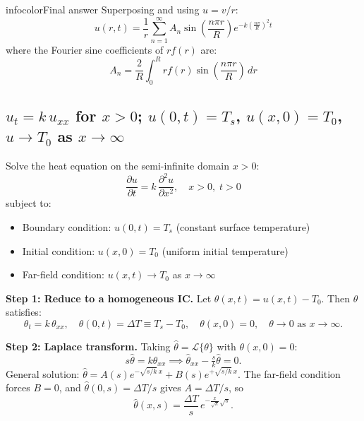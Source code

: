 \documentclass[a4paper,11pt]{article} %
\newenvironment{summarybox}[1][]{\begin{custombox}[#1]{infocolor}{Final answer}}{\end{custombox}}
\begin{document}
\begin{summarybox}[title={General Solution}]
Superposing and using $u=v/r$:
$$ u(r,t) = \frac{1}{r} \sum_{n=1}^{\infty} A_n \sin\!\left(\frac{n\pi r}{R}\right) e^{-k \left(\frac{n\pi}{R}\right)^2 t} $$
where the Fourier sine coefficients of $rf(r)$ are:
$$ A_n = \frac{2}{R} \int_0^R r f(r) \sin\left(\frac{n\pi r}{R}\right) \, dr $$
\end{summarybox}

\newpage
\subsection{\texorpdfstring{$u_t = k\,u_{xx}$ for $x>0$; $u(0,t)=T_s$, $u(x,0)=T_0$, $u\to T_0$ as $x\to\infty$}{Semi-infinite heat equation: Laplace transform in time reduces to ODE; inverse gives error-function solution}}

\begin{problembox}
Solve the heat equation on the semi-infinite domain $x > 0$:
$$\frac{\partial u}{\partial t} = k\,\frac{\partial^2 u}{\partial x^2}, \quad x > 0,\; t > 0$$
subject to:
\begin{itemize}
    \item Boundary condition: $u(0, t) = T_s$ (constant surface temperature)
    \item Initial condition: $u(x, 0) = T_0$ (uniform initial temperature)
    \item Far-field condition: $u(x, t) \to T_0$ as $x \to \infty$
\end{itemize}
\end{problembox}

\textbf{Step 1: Reduce to a homogeneous IC.}
Let $\theta(x,t) = u(x,t) - T_0$. Then $\theta$ satisfies:
\[
    \theta_t = k\,\theta_{xx}, \quad \theta(0,t) = \Delta T \equiv T_s - T_0, \quad \theta(x,0)=0, \quad \theta\to 0 \text{ as } x\to\infty.
\]

\textbf{Step 2: Laplace transform.} Taking $\hat\theta=\mathcal{L}\{\theta\}$ with $\theta(x,0)=0$:
\[
    s\hat\theta = k\hat\theta_{xx} \implies \hat\theta_{xx} - \tfrac{s}{k}\hat\theta = 0.
\]
General solution: $\hat\theta = A(s)e^{-\sqrt{s/k}\,x} + B(s)e^{+\sqrt{s/k}\,x}$. The far-field condition forces $B=0$, and $\hat\theta(0,s)=\Delta T/s$ gives $A=\Delta T/s$, so
\[
    \hat\theta(x,s) = \frac{\Delta T}{s}\,e^{-\frac{x}{\sqrt{k}}\sqrt{s}}.
\]
\end{document}
